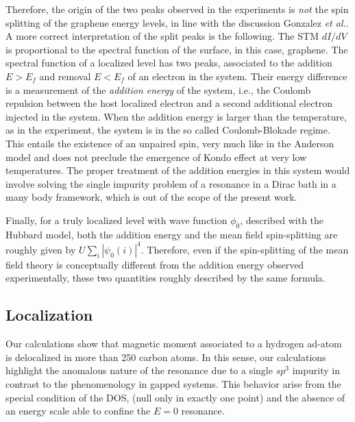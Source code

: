 Therefore, the origin of the two peaks observed in the experiments \cite{Brihuega2016} is {\em not} the spin splitting of the graphene energy levels, in line with the discussion Gonzalez {\em et al.}\cite{Brihuega2016}. A more correct interpretation of the split peaks is the following. The STM $dI/dV$ is proportional to the spectral function of the surface, in this case,  graphene. The spectral function of a localized level has two peaks,  associated to the addition $E>E_f$ and removal $E<E_f$ of an electron in the system. Their energy difference is a measurement of the {\em addition energy} of the system, i.e., the Coulomb repulsion between the host localized electron and a second additional electron injected in the system. When the addition energy is larger than the temperature, as in the experiment, the system is in the so called Coulomb-Blokade regime. This entails the existence of an unpaired spin, very much like in the Anderson model\cite{Anderson1961} and does not preclude the emergence of Kondo effect at very low temperatures. The proper treatment of the addition energies in this system would involve solving the single impurity problem of a resonance in a Dirac bath in a many body framework\cite{Haase2011, Sofo2012, Mitchell2013}, which is out of the scope of the present work.

Finally, for a truly localized level with wave function $\phi_0$, described with the Hubbard model, both the addition energy and the mean field spin-splitting are roughly given by $U\sum_i |\psi_0(i)|^4$. Therefore, even if the spin-splitting of the mean field theory is conceptually different from the addition energy observed experimentally, these two quantities roughly described by the same formula.



\subsection{Localization}
Our calculations show that magnetic moment associated to a hydrogen ad-atom is delocalized in more than 250 carbon atoms.
In this sense, our calculations highlight the anomalous nature of the resonance due to a single $sp^3$ impurity in contrast to the phenomenology in gapped systems. This behavior arise from the special condition of the DOS, (null only in exactly one point) and the absence of an energy scale able to confine the $E=0$ resonance.


